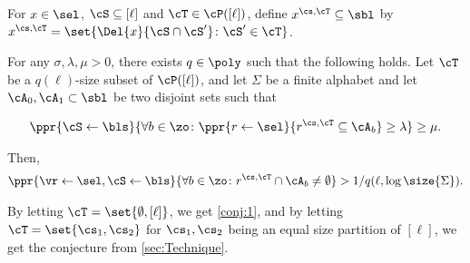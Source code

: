 \begin{notation}
	For $x\in \sel$,  $\cS \subseteq [\ell]$ and $\cT \in \cP([\ell])$, define  $x^{\cs,\cT} \subseteq \sbl$ by $
	x^{\cs,\cT}= \set{\Del{x}{\cS \cap \cS'}\colon \cS'\in \cT} 
	$.%
\end{notation}

\begin{conjecture}\label{conj:3}
	For any $\sigma,\lambda, \mu>0$, there exists $q \in \poly$ such that the following holds.  Let $\cT$ be a  $q(\ell)$-size subset of $\cP([\ell])$, and let  $\Sigma$ be a finite alphabet and let $\cA_0,\cA_1 \subset \sbl$  be  two disjoint sets such that %
	
	\begin{align*}%
	\ppr{\cS \gets \bls}{\forall b\in \zo \colon \ppr{r\gets \sel}{  r^{\cs,\cT} \subseteq \cA_b} \ge \lambda} \ge \mu.
	\end{align*}
	
	Then,
	\begin{align*}%
	\ppr{\vr\gets \sel,\cS \gets \bls}{\forall b\in \zo\colon r^{\cs,\cT} \cap \cA_b \neq \emptyset} > 1/q(\ell,\log\size{\Sigma}).
	\end{align*}
\end{conjecture}
By letting $\cT = \set{\emptyset,[\ell]}$, we get \cref{conj:1}, and by letting $\cT = \set{\cs_1,\cs_2}$ for $\cs_1,\cs_2$ being an equal size partition of $[\ell]$, we get the conjecture from \cref{sec:Technique}.  
